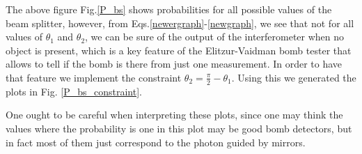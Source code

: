 \documentclass[12pt]{book}
\begin{document}
The above figure Fig.\ref{P_bs} shows probabilities for all possible values of the beam splitter, however, from Eqs.\ref{newergraph}-\ref{newgraph}, we see that not for all values of $\theta_{1}$ and $\theta_{2}$, we can be sure of the output of the interferometer when no object is present, which is a key feature of the Elitzur-Vaidman bomb tester that allows to tell if the bomb is there from just one measurement. In order to have that feature we implement the constraint $\theta_{2}=\frac{\pi}{2}-\theta_{1}$. Using this we generated the plots in Fig. \ref{P_bs_constraint}.

One ought to be careful when interpreting these plots, since one may think the values where the probability is one in this plot may be good bomb detectors, but in fact most of them just correspond to the photon guided by mirrors. 
\end{document}
